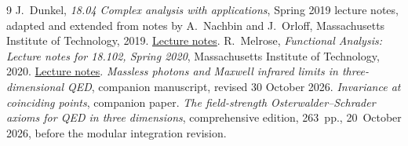 \documentclass[11pt,letterpaper,reqno]{amsart}
\theoremstyle{definition}
\theoremstyle{remark}
\begin{document}
\begin{thebibliography}{9}
\footnotesize
{} J.~Dunkel, \emph{18.04 Complex analysis with applications},
Spring 2019 lecture notes, adapted and extended from notes by
A.~Nachbin and J.~Orloff, Massachusetts Institute of Technology, 2019.
\href{https://math.mit.edu/~dunkel/Teach/18.04_2019S/notes/1804_Main.pdf}{Lecture notes}.
 R.~Melrose, \emph{Functional Analysis: Lecture notes
for 18.102, Spring 2020}, Massachusetts Institute of Technology, 2020.
\href{https://ocw.mit.edu/courses/18-102-introduction-to-functional-analysis-spring-2021/3d4cc88026d44a01f936cd6a0aa995cb_MIT18_102s20_lec_FA.pdf}{Lecture notes}.
 \emph{Massless photons and Maxwell infrared limits
in three-dimensional QED}, companion manuscript, revised 30 October 2026.
 \emph{Invariance at coinciding points}, companion
paper.
 \emph{The field-strength Osterwalder--Schrader
axioms for QED in three dimensions}, comprehensive edition, 263~pp., 20~October 2026,
before the modular integration revision.

\end{thebibliography}
\end{document}
